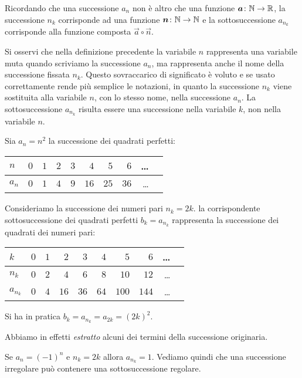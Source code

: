 Ricordando che una successione $a_n$ non è altro che una funzione
$\boldsymbol a\colon {\mathbb N} \to {\mathbb R}$, la successione $n_k$ corrisponde ad una funzione
$\boldsymbol n\colon {\mathbb N} \to {\mathbb N}$ e la sottosuccessione $a_{n_k}$ corrisponde alla
funzione composta $\vec a \circ \vec n$.

Si osservi che nella definizione precedente la variabile $n$ rappresenta
una variabile muta quando scriviamo la successione $a_n$, ma
rappresenta anche il nome della successione fissata $n_k$.
Questo sovraccarico
di significato è voluto e se usato correttamente rende più semplice
le notazioni, in quanto la successione $n_k$ viene sostituita alla
variabile $n$, con lo stesso nome, nella successione $a_n$.
La sottosuccessione $a_{n_k}$ risulta essere una successione nella variabile $k$, non nella variabile $n$.

\begin{example}
Sia $a_n = n^2$ la successione dei quadrati perfetti:
\begin{center}
\begin{tabular}{l|rrrrrrrrr}
$n$   & $0$ & $1$ & $2$ & $3$ & $4$  & $5$  & $6$  & \dots \\ \hline
$a_n$ & $0$ & $1$ & $4$ & $9$ & $16$ & $25$ & $36$ & \dots
\end{tabular}
\end{center}
Consideriamo la successione dei numeri pari $n_k = 2k$.
la corrispondente sottosuccessione dei quadrati perfetti
$b_k = a_{n_k}$
rappresenta la successione dei quadrati dei numeri pari:
\begin{center}
\begin{tabular}{l|rrrrrrrrr}
$k$       & $0$ & $1$ & $2$ & $3$ & $4$  & $5$  & $6$  & \dots \\ \hline
$n_k$ & $0$ & $2$ & $4$ & $6$ & $8$ & $10$ & $12$ & \dots \\
$a_{n_k}$ & $0$ & $4$ & $16$ & $36$ & $64$ & $100$ & $144$ & \dots
\end{tabular}
\end{center}
Si ha in pratica
  $b_k = a_{n_k} = a_{2k} = (2k)^2$.

Abbiamo in effetti \emph{estratto} alcuni dei termini della successione
originaria.
\end{example}

\begin{example}
Se $a_n = (-1)^n$ e $n_k=2k$ allora $a_{n_k} = 1$.
Vediamo quindi che una successione irregolare
può contenere una sottosuccessione regolare.
\end{example}

